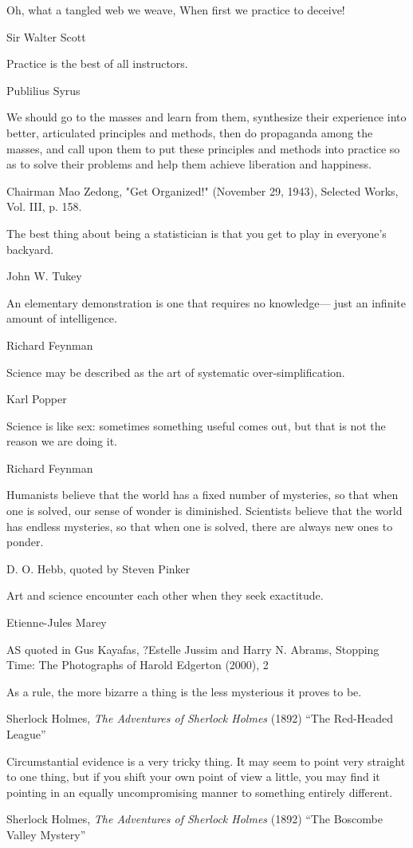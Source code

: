 \epigraph{Oh, what a tangled web we weave, When first we practice to deceive!}{Sir Walter Scott}

\epigraph{Practice is the best of all instructors.}{Publilius Syrus}

\epigraph{We should go to the masses and learn from them, synthesize their experience into better, articulated principles and methods, then do propaganda among the masses, and call upon them to put these principles and methods into practice so as to solve their problems and help them achieve liberation and happiness.}{Chairman Mao Zedong, "Get Organized!" (November 29, 1943), Selected Works, Vol. III, p. 158.}

\epigraph{The best thing about being a statistician is that you get to play in everyone's backyard.}{John W. Tukey}%

\epigraph{An elementary demonstration is one that requires no knowledge--- just an infinite amount of intelligence.}{Richard Feynman}

\epigraph{Science may be described as the art of systematic over-simplification.}{Karl Popper}

\epigraph{Science is like sex: sometimes something useful comes out, but that is not the reason we are doing it.}{Richard Feynman}

\epigraph{Humanists believe that the world has a fixed number of mysteries, so that when one is solved, our sense of wonder is diminished.  Scientists believe that the world has endless mysteries, so that when one is solved, there are always new ones to ponder.}{D. O. Hebb, quoted by Steven Pinker}

\epigraph{Art and science encounter each other when they seek exactitude.}{Etienne-Jules Marey}

AS quoted in Gus Kayafas, ?Estelle Jussim and Harry N. Abrams, Stopping Time: The Photographs of Harold Edgerton (2000), 2

\epigraph{As a rule, the more bizarre a thing is the less mysterious it proves to be.}{Sherlock Holmes,  \emph{The Adventures of Sherlock Holmes} (1892) ``The Red-Headed League''}

\epigraph{Circumstantial evidence is a very tricky thing. It may seem to point very straight to one thing, but if you shift your own point of view a little, you may find it pointing in an equally uncompromising manner to something entirely different.}{Sherlock Holmes, \emph{The Adventures of Sherlock Holmes} (1892) ``The Boscombe Valley Mystery''}

